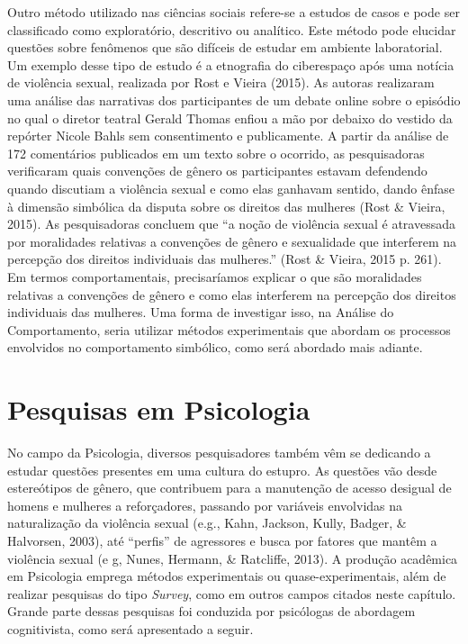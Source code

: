 Outro método utilizado nas ciências sociais refere-se a estudos de casos e pode ser classificado como exploratório, descritivo ou analítico. Este método pode elucidar questões sobre fenômenos que são difíceis de estudar em ambiente laboratorial. Um exemplo desse tipo de estudo é a etnografia do ciberespaço após uma notícia de violência sexual, realizada por Rost e Vieira (2015). As autoras realizaram uma análise das narrativas dos participantes de um debate online sobre o episódio no qual o diretor teatral Gerald Thomas enfiou a mão por debaixo do vestido da repórter Nicole Bahls sem consentimento e publicamente. A partir da análise de 172 comentários publicados em um texto sobre o ocorrido, as pesquisadoras verificaram quais convenções de gênero os participantes estavam defendendo quando discutiam a violência sexual e como elas ganhavam sentido, dando ênfase à dimensão simbólica da disputa sobre os direitos das mulheres (Rost \& Vieira, 2015). As pesquisadoras concluem que ``a noção de violência sexual é atravessada por moralidades relativas a convenções de gênero e sexualidade que interferem na percepção dos direitos individuais das mulheres.'' (Rost \& Vieira, 2015 p. 261). Em termos comportamentais, precisaríamos explicar o que são moralidades relativas a convenções de gênero e como elas interferem na percepção dos direitos individuais das mulheres. Uma forma de investigar isso, na Análise do Comportamento, seria utilizar métodos experimentais que abordam os processos envolvidos no comportamento simbólico, como será abordado mais adiante.

\section{Pesquisas em Psicologia}

No campo da Psicologia, diversos pesquisadores também vêm se dedicando a estudar questões presentes em uma cultura do estupro. As questões vão desde estereótipos de gênero, que contribuem para a manutenção de acesso desigual de homens e mulheres a reforçadores, passando por variáveis envolvidas na naturalização da violência sexual (e.g., Kahn, Jackson, Kully, Badger, \& Halvorsen, 2003), até ``perfis'' de agressores e busca por fatores que mantêm a violência sexual (e g, Nunes, Hermann, \& Ratcliffe, 2013). A produção acadêmica em Psicologia emprega métodos experimentais ou quase-experimentais, além de realizar pesquisas do tipo \textit{Survey}, como em outros campos citados neste capítulo. Grande parte dessas pesquisas foi conduzida por psicólogas de abordagem cognitivista, como será apresentado a seguir.

